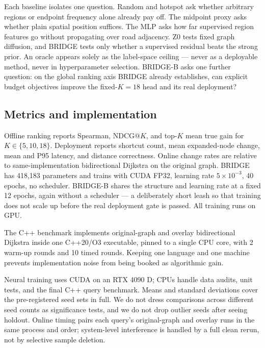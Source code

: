 \documentclass[5p,twocolumn,authoryear]{elsarticle}
\newcommand{\zmethod}{Z0}
\newcommand{\gmethod}{BRIDGE}
\newcommand{\bmethod}{BRIDGE-B}
\begin{document}
Each baseline isolates one question. Random and hotspot ask whether arbitrary regions or
endpoint frequency alone already pay off. The midpoint proxy asks whether plain spatial
position suffices. The MLP asks how far supervised region features go without propagating
over road adjacency. \zmethod{} tests fixed graph diffusion, and \gmethod{} tests only
whether a supervised residual beats the strong prior. An oracle appears solely as the
label-space ceiling --- never as a deployable method, never in hyperparameter selection.
\bmethod{} asks one further question: on the global ranking axis \gmethod{} already
establishes, can explicit budget objectives improve the fixed-$K{=}18$ head and its real
deployment?

\subsection{Metrics and implementation}

Offline ranking reports Spearman, NDCG@$K$, and top-$K$ mean true gain for
$K\in\{5,10,18\}$. Deployment reports shortcut count, mean expanded-node change, mean and
P95 latency, and distance correctness. Online change rates are relative to
same-implementation bidirectional Dijkstra on the original graph. \gmethod{} has 418,183
parameters and trains with CUDA FP32, learning rate $5\times10^{-3}$, 40 epochs, no
scheduler. \bmethod{} shares the structure and learning rate at a fixed 12 epochs, again
without a scheduler --- a deliberately short leash so that training does not scale up before
the real deployment gate is passed. All training runs on GPU.

The C++ benchmark implements original-graph and overlay bidirectional Dijkstra inside one
C++20/O3 executable, pinned to a single CPU core, with 2 warm-up rounds and 10 timed
rounds. Keeping one language and one machine prevents implementation noise from being
booked as algorithmic gain.

Neural training uses CUDA on an RTX 4090 D; CPUs handle data audits, unit tests, and the
final C++ query benchmark. Means and standard deviations cover the pre-registered seed
sets in full. We do not dress comparisons across different seed counts as significance
tests, and we do not drop outlier seeds after seeing holdout. Online timing pairs each
query's original-graph and overlay runs in the same process and order; system-level
interference is handled by a full clean rerun, not by selective sample deletion.
\end{document}
